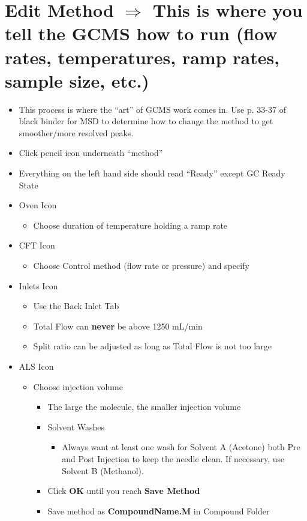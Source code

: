 \documentclass[letterpaper,11pt]{article}
\begin{document}
\section{Edit Method $\Longrightarrow$ This is where you tell the GCMS how to run (flow rates, temperatures, ramp rates, sample size, etc.)}
	\begin{itemize}
	\item This process is where the ``art'' of GCMS work comes in. Use p. 33-37 of black binder for MSD to determine how to change the method to get smoother/more resolved peaks.
    \item Click pencil icon underneath ``method''
    \item Everything on the left hand side should read ``Ready'' except GC Ready State
    \item Oven Icon
    	\begin{itemize}
    	\item Choose duration of temperature holding a ramp rate 
        \end{itemize}
    \item CFT Icon
    	\begin{itemize}
    	\item Choose Control method (flow rate or pressure) and specify
        \end{itemize}
    \item Inlets Icon
    	\begin{itemize}
    	\item Use the Back Inlet Tab
        \item Total Flow can \textbf{never} be above 1250 mL/min
        \item Split ratio can be adjusted as long as Total Flow is not too large
        \end{itemize}
    \item ALS Icon
    	\begin{itemize}
    	\item Choose injection volume
        	\begin{itemize}
        	\item The large the molecule, the smaller injection volume
        	\end{itemize}
		\begin{itemize}
		\item Solvent Washes
        	\begin{itemize}
        	\item Always want at least one wash for Solvent A (Acetone) both Pre and Post Injection to keep the needle clean. If necessary, use Solvent B (Methanol).
        	\end{itemize}
        \item Click \textbf{OK} until you reach \textbf{Save Method}
        \item Save method as \textbf{CompoundName.M} in Compound Folder
		\end{itemize}
    \end{itemize}
\end{itemize}
\end{document}
